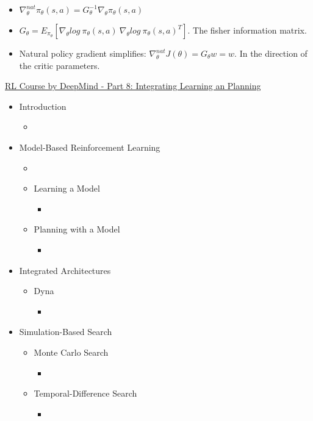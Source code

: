 \begin{itemize}
\begin{itemize}
\begin{itemize}[noitemsep,nolistsep]
			\item $\nabla_\theta^{nat} \pi_\theta(s,a) = G_\theta^{-1} \nabla_\theta \pi_\theta (s,a)$
			\item $G_\theta = E_{\pi_\theta} [\nabla_\theta log\ \pi_\theta(s,a)\ \nabla_\theta log\ \pi_\theta(s,a)^T]$. The fisher information matrix.
			\item Natural policy gradient simplifies: $\nabla_\theta^{nat} J(\theta) = G_\theta w = w$. In the direction of the critic parameters.
		\end{itemize}
	\end{itemize}
\end{itemize}
\href{https://www.youtube.com/watch?v=ItMutbeOHtc}{RL Course by DeepMind - Part 8: Integrating Learning an Planning}
\begin{itemize}[noitemsep,nolistsep]
	\item Introduction
	\begin{itemize}[noitemsep,nolistsep]
		\item 
	\end{itemize}
	\item Model-Based Reinforcement Learning
	\begin{itemize}[noitemsep,nolistsep]
		\item 
		\item Learning a Model
		\begin{itemize}[noitemsep,nolistsep]
			\item 
		\end{itemize}
		\item Planning with a Model
		\begin{itemize}[noitemsep,nolistsep]
			\item 
		\end{itemize}
	\end{itemize}
	\item Integrated Architectures
	\begin{itemize}[noitemsep,nolistsep]
		\item Dyna
		\begin{itemize}[noitemsep,nolistsep]
			\item 
		\end{itemize}
	\end{itemize}
	\item Simulation-Based Search
	\begin{itemize}[noitemsep,nolistsep]
		\item Monte Carlo Search
		\begin{itemize}[noitemsep,nolistsep]
			\item 
		\end{itemize}
		\item  Temporal-Difference Search
		\begin{itemize}[noitemsep,nolistsep]
			\item 
		\end{itemize}
	\end{itemize}
\end{itemize}
